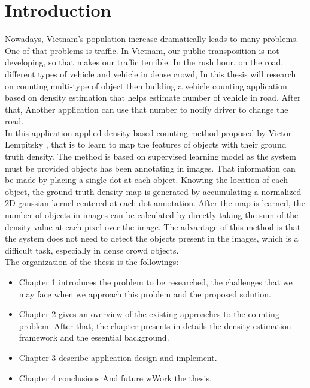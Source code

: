 \chapter{Introduction}
Nowadays, Vietnam's population increase dramatically leads to many problems. One of that problems is traffic. In Vietnam, our public transposition is not developing, so that makes our traffic terrible. In the rush hour, on the road, different types of vehicle and vehicle in dense crowd, In this thesis will research on counting multi-type of object then building a vehicle counting application based on density estimation that helps estimate number of vehicle in road. After that, Another application can use that number to notify driver to change the road. \\
In this application applied density-based counting method proposed by Victor Lempitsky \cite{Lempitsky:Zisserman:Destimate}, that is to learn to map the features of objects with their ground truth density. The method is based on supervised learning model as the system must be provided objects has been annotating in images. That information can be made by placing a single dot at each object. Knowing the location of each object, the ground truth density map is generated by accumulating a normalized 2D gaussian kernel centered at each dot annotation. After the map is learned, the number of objects in images can be calculated by directly taking the sum of the density value at each pixel over the image. The advantage of this method is that the system does not need to detect the objects present in the images, which is a difficult task, especially in dense crowd objects. \\
The organization of the thesis is the followings:
\begin{itemize}
	\item Chapter 1 introduces the problem to be researched, the challenges that we may face when we approach this problem and the proposed solution.
	\item Chapter 2 gives an overview of the existing approaches to the counting problem. After that, the chapter presents in details the density estimation framework and the essential background.
	\item Chapter 3 describe application design and implement.
	\item Chapter 4 conclusions And future wWork the thesis.  
\end{itemize}
